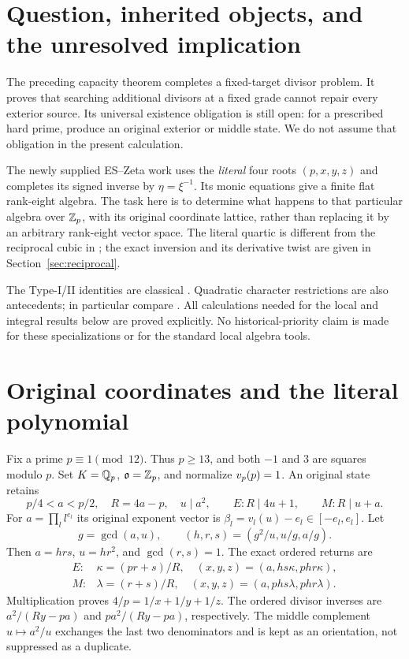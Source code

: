 \section{Question, inherited objects, and the unresolved implication}
The preceding capacity theorem \cite{Capacity} completes a fixed-target divisor
problem. It proves that searching additional divisors at a fixed grade cannot
repair every exterior source. Its universal existence obligation is still open:
for a prescribed hard prime, produce an original exterior or middle state.
We do not assume that obligation in the present calculation.

The newly supplied ES--Zeta work \cite[\S\S1--3, equations (8)--(24)]{Input}
uses the \emph{literal} four roots $(p,x,y,z)$ and completes its signed inverse
by $\eta=\xi^{-1}$. Its monic equations give a finite flat rank-eight algebra.
The task here is to determine what happens to that particular algebra over
$\mathbb Z_p$, with its original coordinate lattice, rather than replacing it by an
arbitrary rank-eight vector space. The literal quartic is different from the
reciprocal cubic in \cite{Reciprocal}; the exact inversion and its derivative
twist are given in Section~\ref{sec:reciprocal}.

The Type-I/II identities are classical \cite[\S2, Propositions 2.2 and 2.6]{ET}.
Quadratic character restrictions are also antecedents; in particular compare
\cite[Corollary 1.3 and Appendix A]{BL}. All calculations needed for the local
and integral results below are proved explicitly. No historical-priority claim
is made for these specializations or for the standard local algebra tools.

\section{Original coordinates and the literal polynomial}
Fix a prime $p\equiv1\pmod{12}$. Thus $p\ge13$, and both $-1$ and $3$ are
squares modulo $p$. Set $K=\mathbb Q_p$, $\mathfrak o=\mathbb Z_p$, and normalize $v_p(p)=1$.
An original state retains
\[
 p/4<a<p/2,\quad R=4a-p,\quad u\mid a^2,
 \qquad E:R\mid4u+1,\qquad M:R\mid u+a.
 \tag{IC1}
\]
For $a=\prod_l l^{e_l}$ its original exponent vector is
$\beta_l=v_l(u)-e_l\in[-e_l,e_l]$. Let
\[
 g=\gcd(a,u),\qquad (h,r,s)=(g^2/u,u/g,a/g).
\]
Then $a=hrs$, $u=hr^2$, and $\gcd(r,s)=1$. The exact ordered returns are
\[
\begin{array}{ll}
 E:&\kappa=(pr+s)/R,\quad (x,y,z)=(a,hs\kappa,phr\kappa),\\
 M:&\lambda=(r+s)/R,\quad (x,y,z)=(a,phs\lambda,phr\lambda).
\end{array}                                                     \tag{IC2}
\]
Multiplication proves $4/p=1/x+1/y+1/z$. The ordered divisor inverses are
$a^2/(Ry-pa)$ and $pa^2/(Ry-pa)$, respectively. The middle complement
$u\mapsto a^2/u$ exchanges the last two denominators and is kept as an orientation,
not suppressed as a duplicate.

